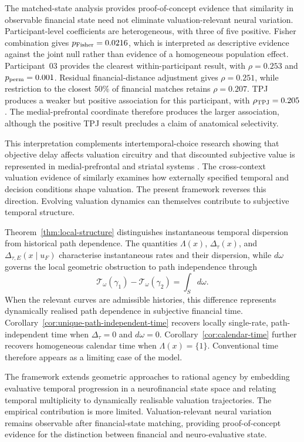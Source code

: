 \documentclass[graybox,natbib]{SNmult}
\providecommand{\1}{}
\renewcommand{\1}{\mathbbm 1}
\begin{document}
The matched-state analysis provides proof-of-concept evidence that similarity
in observable financial state need not eliminate valuation-relevant neural
variation. Participant-level coefficients are heterogeneous, with three of
five positive. Fisher combination gives \(p_{\rm Fisher}=0.0216\), which is
interpreted as descriptive evidence against the joint null rather than
evidence of a homogeneous population effect. Participant~03 provides the
clearest within-participant result, with \(\rho=0.253\) and
\(p_{\rm perm}=0.001\). Residual financial-distance adjustment gives
\(\rho=0.251\), while restriction to the closest \(50\%\) of financial matches
retains \(\rho=0.207\). TPJ produces a weaker but positive association for this
participant, with \(\rho_{\rm TPJ}=0.205\). The medial-prefrontal coordinate
therefore produces the larger association, although the positive TPJ result
precludes a claim of anatomical selectivity.

This interpretation complements intertemporal-choice research showing that
objective delay affects valuation circuitry and that discounted subjective
value is represented in medial-prefrontal and striatal systems
\citep{McClureLaibsonLoewensteinCohen2004,KableGlimcher2007,
WittmannPaulus2008}. The cross-context valuation evidence of
\citet{PivaEtAl2019} similarly examines how externally specified temporal and
decision conditions shape valuation. The present framework reverses this
direction. Evolving valuation dynamics can themselves contribute to subjective
temporal structure.

Theorem~\ref{thm:local-structure} distinguishes instantaneous temporal
dispersion from historical path dependence. The quantities \(\Lambda(x)\),
\(\Delta_\tau(x)\), and \(\Delta_{\tau,E}(x\mid u_F)\) characterise
instantaneous rates and their dispersion, while \(d\omega\) governs the local
geometric obstruction to path independence through
\[
\mathcal T_\omega(\gamma_1)-\mathcal T_\omega(\gamma_2)
=
\int_S d\omega.
\]
When the relevant curves are admissible histories, this difference represents
dynamically realised path dependence in subjective financial time.
Corollary~\ref{cor:unique-path-independent-time} recovers locally single-rate,
path-independent time when \(\Delta_\tau=0\) and \(d\omega=0\).
Corollary~\ref{cor:calendar-time} further recovers homogeneous calendar time
when \(\Lambda(x)=\{1\}\). Conventional time therefore appears as a limiting
case of the model.

The framework extends geometric approaches to rational agency
\citep{Stiefenhofer2026GeometryTime,Stiefenhofer2026EconomicTemporality,
Stiefenhofer2026KantianTime,Stiefenhofer2025EthicalConsumption}
by embedding evaluative temporal progression in a neurofinancial state space
and relating temporal multiplicity to dynamically realisable valuation
trajectories. The empirical contribution is more limited. Valuation-relevant
neural variation remains observable after financial-state matching, providing
proof-of-concept evidence for the distinction between financial and
neuro-evaluative state.
\end{document}
